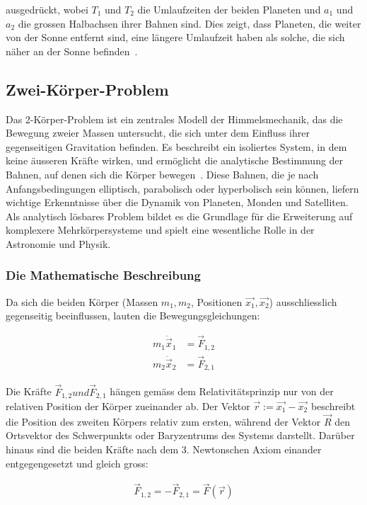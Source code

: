 \documentclass[a4paper,12pt,twoside]{article}
\begin{document}
ausgedrückt, wobei \(T_1\) und \(T_2\) die Umlaufzeiten der beiden Planeten und \(a_1\) und \(a_2\) die grossen Halbachsen ihrer Bahnen sind. Dies zeigt, dass Planeten, die weiter von der Sonne entfernt sind, eine längere Umlaufzeit haben als solche, die sich näher an der Sonne befinden~\cite{Haase1998}.

\subsection{Zwei-Körper-Problem}
Das 2-Körper-Problem ist ein zentrales Modell der Himmelsmechanik, das die Bewegung zweier Massen untersucht, die sich unter dem Einfluss ihrer gegenseitigen Gravitation befinden. Es beschreibt ein isoliertes System, in dem keine äusseren Kräfte wirken, und ermöglicht die analytische Bestimmung der Bahnen, auf denen sich die Körper bewegen~\cite{Spektrum}. Diese Bahnen, die je nach Anfangsbedingungen elliptisch, parabolisch oder hyperbolisch sein können, liefern wichtige Erkenntnisse über die Dynamik von Planeten, Monden und Satelliten. Als analytisch lösbares Problem bildet es die Grundlage für die Erweiterung auf komplexere Mehrkörpersysteme und spielt eine wesentliche Rolle in der Astronomie und Physik.

\subsubsection{Die Mathematische Beschreibung}

Da sich die beiden Körper (Massen \( m_1, m_2 \), Positionen \( \vec{x_1}, \vec{x_2} \)) ausschliesslich gegenseitig beeinflussen, lauten die Bewegungsgleichungen:

\begin{align*}
	m_1 \ddot{\vec{x}}_1 &= \vec{F}_{1,2} \\
	m_2 \ddot{\vec{x}}_2 &= \vec{F}_{2,1}
\end{align*}

Die Kräfte \( \vec{F}_{1,2} und \vec{F}_{2,1} \) hängen gemäss dem Relativitätsprinzip nur von der relativen Position der Körper zueinander ab. Der Vektor \( \vec{r} := \vec{x_1} - \vec{x_2} \) 
beschreibt die Position des zweiten Körpers relativ zum ersten, während der Vektor \( \vec{R} \) den Ortsvektor des Schwerpunkts oder Baryzentrums des Systems darstellt. 
Darüber hinaus sind die beiden Kräfte nach dem 3. Newtonschen Axiom einander entgegengesetzt und gleich gross:

\begin{align*}
\vec{F}_{1,2} = -\vec{F}_{2,1} = \vec{F}(\vec{r})
\end{align*}
\end{document}
